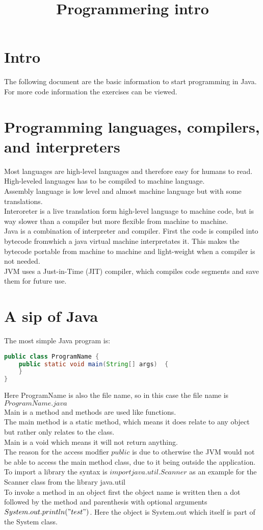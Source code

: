 \documentclass[12pt, a4paper]{article}
\title{Programmering intro}
\date{}
\begin{document}
	\maketitle
	\tableofcontents
	\clearpage
		\section{Intro}
			The following document are the basic information to start programming in Java. For more code information the exercises can be viewed.
		\section{Programming languages, compilers, and interpreters}
			Most languages are high-level languages and therefore easy for humans to read.\\
			High-leveled languages has to be compiled to machine language.\\
			Assembly language is low level and almost machine language but with some translations.\\
			Interoreter is a live translation form high-level language to machine code, but is way slower than a compiler but more flexible from machine to machine.\\
			Java is a combination of interpreter and compiler. First the code is compiled into bytecode fromwhich a java virtual machine interpretates it. This makes the bytecode portable from machine to machine and light-weight when a compiler is not needed.\\
			JVM uses a Just-in-Time (JIT) compiler, which compiles code segments and save them for future use.\\
		\section{A sip of Java}
			The most simple Java program is:
			\begin{lstlisting}[language = Java , frame = trBL , firstnumber = last]
public class ProgramName {
	public static void main(String[] args)  {
	}
}
			\end{lstlisting}
			Here ProgramName is also the file name, so in this case the file name is $ProgramName.java$\\
			Main is a method and methods are used like functions.\\
			The main method is a static method, which means it does relate to any object but rather only relates to the class.\\
			Main is a void which means it will not return anything.\\
			The reason for the access modfier $public$ is due to otherwise the JVM would not be able to access the main method class, due to it being outside the application.\\[8mm]
			To import a library the syntax is $import java.util.Scanner$ as an example for the Scanner class from the library java.util\\
			To invoke a method in an object first the object name is written then a dot followed by the method and parenthesis with optional arguments $System.out.println("test")$. Here the object is System.out which itself is part of the System class.\\
\end{document}
